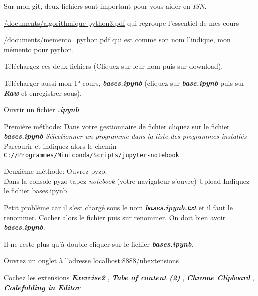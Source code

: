 \documentclass[10pt,dvipsnames,  dvips]{article}
\begin{document}
\begin{list}{}{}
\medskip
Sur mon git, deux fichiers sont important pour vous aider en \textit{ISN}.
\begin{list}{-}{}
\item \url{/documents/algorithmique-python3.pdf} qui regroupe l'essentiel de mes cours 
\item \url{/documents/memento_python.pdf} qui est comme son nom l'indique, mon mémento pour python.
\end{list}

Téléchargez ces deux fichiers  (Cliquez sur leur nom puis sur download).

Télécharger aussi mon 1° cours, \textbf{\textit{bases.ipynb}} (cliquez sur \textit{\textbf{base.ipynb}} puis sur \textit{\textbf{Raw}} et enregistrer sous).\\





\item  Ouvrir un fichier  \textbf{\textit{.ipynb}}
\begin{list}{-}{}
\item Première méthode:  Dans votre gestionnaire de fichier cliquez sur le fichier\\
 \textbf{\textit{bases.ipynb}}   \textit{Sélectionner un programme dans la liste des programmes installés}  Parcourir et indiquez alors le chemin  \verb+C://Programmes/Miniconda/Scripts/jupyter-notebook+



\item Deuxième méthode:  Ouvrez pyzo.\\
 Dans la console pyzo tapez \textit{notebook}  (votre navigateur  s'ouvre)   Upload  Indiquez le fichier bases.ipynb	\medskip

	Petit problème car il s'est chargé sous le nom \textit{\textbf{bases.ipynb.txt}} et il faut le renommer.  Cocher alors le fichier puis sur renommer.  On doit bien avoir \textit{\textbf{bases.ipynb}}.

Il ne reste plus qu'à double cliquer sur le fichier \textit{\textbf{bases.ipynb}}.


\end{list}

\item Ouvrez un onglet à l'adresse \url{localhost:8888/nbextensions}

Cochez les extensions \textbf{\textit{Exercise2}} , \textbf{\textit{Tabe of content (2)}} , \textbf{\textit{Chrome Clipboard}} , \textbf{\textit{Codefolding in Editor}}
\end{list}
\end{document}
